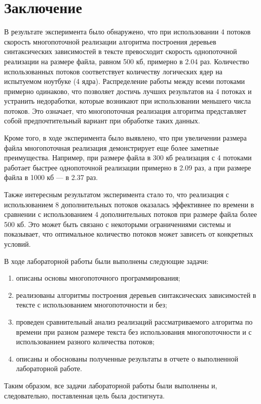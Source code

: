 \chapter*{Заключение}

В результате эксперимента было обнаружено, что при использовании 4 потоков скорость многопоточной реализации алгоритма построения деревьев синтаксических зависимостей в тексте превосходит скорость однопоточной реализации на размере файла, равном 500 кб, примерно в 2.04 раз. Количество использованных потоков соответствует количеству логических ядер на испытуемом ноутбуке (4 ядра). Распределение работы между всеми потоками примерно одинаково, что позволяет достичь лучших результатов на 4 потоках и устранить недоработки, которые возникают при использовании меньшего числа потоков. Это означает, что многопоточная реализация алгоритма представляет собой предпочтительный вариант при обработке таких данных.

Кроме того, в ходе эксперимента было выявлено, что при увеличении размера файла многопоточная реализация демонстрирует еще более заметные преимущества. Например, при размере файла в 300 кб реализация с 4 потоками работает быстрее однопоточной реализации примерно в 2.09 раз, а при размере файла в 1000 кб --- в 2.37 раз.

Также интересным результатом эксперимента стало то, что реализация с использованием 8 дополнительных потоков оказалась эффективнее по времени в сравнении с использованием 4 дополнительных потоков при размере файла более 500 кб. Это может быть связано с некоторыми ограничениями системы и показывает, что оптимальное количество потоков может зависеть от конкретных условий.

В ходе лабораторной работы были выполнены следующие задачи:
\begin{enumerate}[label=\arabic*)]
	\item описаны основы многопоточного программирования;
	\item реализованы алгоритмы построения деревьев синтаксических зависимостей в тексте с использованием многопоточности и без;
	\item проведен сравнительный анализ реализаций рассматриваемого алгоритма по времени при разном размере текста без использования многопоточности и с использованием разного количества потоков;
	\item описаны и обоснованы полученные результаты в отчете о выполненной лабораторной работе.
\end{enumerate} 


Таким образом, все задачи лабораторной работы были выполнены и, следовательно, поставленная цель была достигнута.